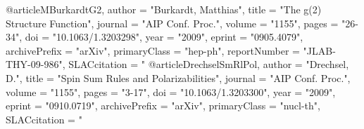 @article{MBurkardtG2,
      author         = "Burkardt, Matthias",
      title          = "{The g(2) Structure Function}",
      journal        = "AIP Conf. Proc.",
      volume         = "1155",
      pages          = "26-34",
      doi            = "10.1063/1.3203298",
      year           = "2009",
      eprint         = "0905.4079",
      archivePrefix  = "arXiv",
      primaryClass   = "hep-ph",
      reportNumber   = "JLAB-THY-09-986",
      SLACcitation   = "%
}
@article{DrechselSmRlPol,
      author         = "Drechsel, D.",
      title          = "{Spin Sum Rules and Polarizabilities}",
      journal        = "AIP Conf. Proc.",
      volume         = "1155",
      pages          = "3-17",
      doi            = "10.1063/1.3203300",
      year           = "2009",
      eprint         = "0910.0719",
      archivePrefix  = "arXiv",
      primaryClass   = "nucl-th",
      SLACcitation   = "%
}


